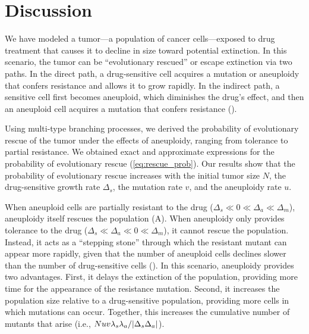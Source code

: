 \documentclass[12pt]{extarticle}
\begin{document}


\section*{Discussion}

We have modeled a tumor---a population of cancer cells---exposed to drug treatment that causes it to decline in size toward potential extinction.
In this scenario, the tumor can be ``evolutionary rescued'' or escape extinction via two paths.
In the direct path, a drug-sensitive cell acquires a mutation or aneuploidy that confers resistance and allows it to grow rapidly.
In the indirect path, a sensitive cell first becomes aneuploid, which diminishes the drug's effect, and then an aneuploid cell acquires a mutation that confers resistance (). 

Using multi-type branching processes, we derived the probability of evolutionary rescue of the tumor under the effects of aneuploidy, ranging from tolerance to partial resistance.
We obtained exact and approximate expressions for the probability of evolutionary rescue (\cref{eq:rescue_prob}). 
Our results show that the probability of evolutionary rescue increases with the initial tumor size $N$, the drug-sensitive growth rate $\Delta_s$, the mutation rate $v$, and the aneuploidy rate $u$.

When aneuploid cells are partially resistant to the drug ($\Delta_s\ll0\ll\Delta_a\ll\Delta_m$), aneuploidy itself rescues the population (A). 
When aneuploidy only provides tolerance to the drug ($\Delta_s\ll\Delta_a\ll0\ll\Delta_m$), it cannot rescue the population.
Instead, it acts as a ``stepping stone'' through which the resistant mutant can appear more rapidly, given that the number of aneuploid cells declines slower than the number of drug-sensitive cells (). In this scenario, aneuploidy provides two advantages. First, it delays the extinction of the population, providing more time for the appearance of the resistance mutation. Second, it increases the population size relative to a drug-sensitive population, providing more cells in which mutations can occur. Together, this increases the cumulative number of mutants that arise (i.e., $Nuv\lambda_s\lambda_a/\abs{\Delta_s\Delta_a}$). %
\end{document}
